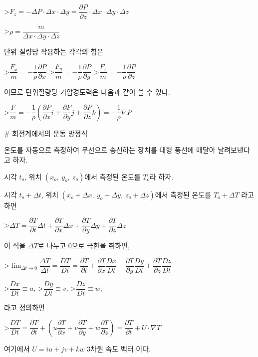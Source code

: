 >$ F_{z} = - \Delta P \cdot \Delta x \cdot \Delta y 
= \dfrac{\partial P}{\partial z} \cdot \Delta x \cdot \Delta y \cdot \Delta z $

>$ \rho = \dfrac {m}{\Delta x \cdot \Delta y \cdot \Delta z} $ 

단위 질량당 작용하는 각각의 힘은

>$ \dfrac {F_{x}}{m} = - \dfrac{1}{\rho} \dfrac{\partial P}{\partial x} $ 
>$ \dfrac {F_{y}}{m} = - \dfrac{1}{\rho} \dfrac{\partial P}{\partial y} $ 
>$ \dfrac {F_{z}}{m} = - \dfrac{1}{\rho} \dfrac{\partial P}{\partial z} $ 

이므로 단위질량당 기압경도력은 다음과 같이 쓸 수 있다.

>$ \dfrac {F}{m} = - \dfrac{1}{\rho} \left( \dfrac{\partial P}{\partial x} i + \dfrac{\partial P}{\partial y} j + \dfrac{\partial P}{\partial z} k \right) 
= - \dfrac{1}{\rho} \nabla P$ 

# 회전계에서의 운동 방정식

온도를 자동으로 측정하여 무선으로 송신하는 장치를 대형 풍선에 매달아 날려보낸다고 하자.

시각 $ t_{o}$, 위치 $(x_{o},~y_{o},~z_{o})$에서 측정된 온도를 $T_{o}$라 하자. 

시각 $ t_{o}+\Delta t$, 위치 $(x_{o}+\Delta x,~y_{o}+\Delta y,~z_{o}+\Delta z)$에서 측정된 온도를 $T_{o}+\Delta T$ 라고 하면

>$ \Delta T = \dfrac{\partial T}{\partial t} \Delta t 
+ \dfrac{\partial T}{\partial x} \Delta x 
+ \dfrac{\partial T}{\partial y} \Delta y 
+ \dfrac{\partial T}{\partial z} \Delta z $

이 식을 $ \Delta T $로 나누고 0으로 극한을 취하면,

>$ \displaystyle \lim_{\Delta t \rightarrow 0} \dfrac{\Delta T}{\Delta t} 
= \dfrac{DT}{Dt} = \dfrac{\partial T}{\partial t} 
+ \dfrac{\partial T}{\partial x} \dfrac{Dx}{Dt}
+ \dfrac{\partial T}{\partial y} \dfrac{Dy}{Dt}
+ \dfrac{\partial T}{\partial z} \dfrac{Dz}{Dt} $

>$\dfrac{Dx}{Dt} \equiv u$, 
>$\dfrac{Dy}{Dt} \equiv v$, 
>$\dfrac{Dz}{Dt} \equiv w$, 

라고 정의하면


>$ \dfrac{DT}{Dt} = \dfrac{\partial T}{\partial t} 
+ \left( u \dfrac{\partial T}{\partial x}
+ v \dfrac{\partial T}{\partial y}
+ w \dfrac{\partial T}{\partial z} \right)
= \dfrac{\partial T}{\partial t} + U \cdot \nabla T $

여기에서 $ U = iu + jv + kw $ 3차원 속도 벡터 이다.

